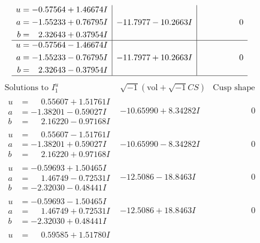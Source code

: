 \documentclass[1p]{elsarticle_modified}
\theoremstyle{definition}
\newcommand{\I}{\sqrt{-1}}
\begin{document}
$$\begin{array}{c|c|c}
\begin{aligned}
u &= -0.57564 + 1.46674 I \\
a &= -1.55233 + 0.76795 I \\
b &= \phantom{-}2.32643 + 0.37954 I\end{aligned}
 & -11.7977 - 10.2663 I & \phantom{-0.000000 } 0 \\ \hline\begin{aligned}
u &= -0.57564 - 1.46674 I \\
a &= -1.55233 - 0.76795 I \\
b &= \phantom{-}2.32643 - 0.37954 I\end{aligned}
 & -11.7977 + 10.2663 I & \phantom{-0.000000 } 0\\
 \hline 
 \end{array}$$\newpage$$\begin{array}{c|c|c}  
\text{Solutions to }I^u_{1}& \I (\text{vol} + \sqrt{-1}CS) & \text{Cusp shape}\\
 \hline 
\begin{aligned}
u &= \phantom{-}0.55607 + 1.51761 I \\
a &= -1.38201 - 0.59027 I \\
b &= \phantom{-}2.16220 - 0.97168 I\end{aligned}
 & -10.65990 + 8.34282 I & \phantom{-0.000000 } 0 \\ \hline\begin{aligned}
u &= \phantom{-}0.55607 - 1.51761 I \\
a &= -1.38201 + 0.59027 I \\
b &= \phantom{-}2.16220 + 0.97168 I\end{aligned}
 & -10.65990 - 8.34282 I & \phantom{-0.000000 } 0 \\ \hline\begin{aligned}
u &= -0.59693 + 1.50465 I \\
a &= \phantom{-}1.46749 - 0.72531 I \\
b &= -2.32030 - 0.48441 I\end{aligned}
 & -12.5086 - 18.8463 I & \phantom{-0.000000 } 0 \\ \hline\begin{aligned}
u &= -0.59693 - 1.50465 I \\
a &= \phantom{-}1.46749 + 0.72531 I \\
b &= -2.32030 + 0.48441 I\end{aligned}
 & -12.5086 + 18.8463 I & \phantom{-0.000000 } 0 \\ \hline\begin{aligned}
u &= \phantom{-}0.59585 + 1.51780 I \\

\end{aligned}
\end{array}$$
\end{document}
